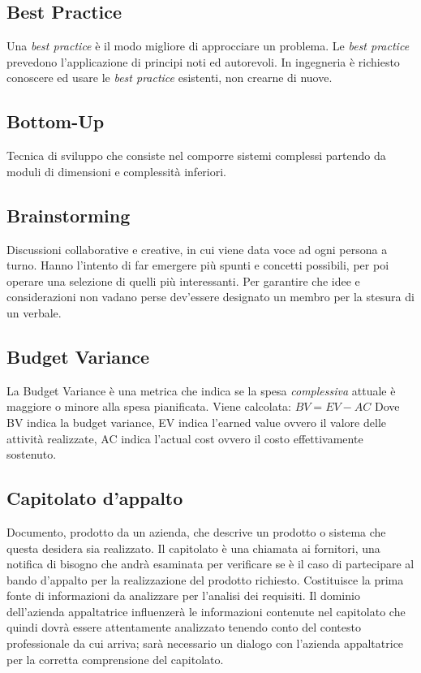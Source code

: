 	
	\subsection{Best Practice}
	\label{sec:bestpractice}
	Una \emph{best practice} è il modo migliore di approcciare un problema. Le \emph{best practice} prevedono l'applicazione di principi noti ed autorevoli. In ingegneria è richiesto conoscere ed usare le \emph{best practice} esistenti, non crearne di nuove.


	\subsection{Bottom-Up}
	\label{sec:bottomup}
	Tecnica di sviluppo che consiste nel comporre sistemi complessi partendo da moduli di dimensioni e complessità inferiori.
	
	
	\subsection{Brainstorming}
	\label{sec:brainstorming}
	Discussioni collaborative e creative, in cui viene data voce ad ogni persona a turno. Hanno l'intento di far emergere più spunti e concetti possibili, per poi operare una selezione di quelli più interessanti. Per garantire che idee e considerazioni non vadano perse dev'essere designato un membro per la stesura di un verbale.

	
	\subsection{Budget Variance}
	\label{sec:budgetvariance}
	La Budget Variance è una metrica che indica se la spesa \textit{complessiva} attuale è maggiore o minore alla spesa pianificata. Viene calcolata: $BV = EV - AC$ Dove BV indica la budget variance, EV indica l'earned value ovvero il valore delle attività realizzate, AC indica l'actual cost ovvero il costo effettivamente sostenuto.
	
	\newpage

	
	\subsection{Capitolato d'appalto}
	\label{sec:capitolato}
	Documento, prodotto da un azienda, che descrive un prodotto o sistema che questa desidera sia realizzato. Il capitolato è una chiamata ai fornitori, una notifica di bisogno che andrà esaminata per verificare se è il caso di partecipare al bando d'appalto per la realizzazione del prodotto richiesto. Costituisce la prima fonte di informazioni da analizzare per l'analisi dei requisiti. Il dominio dell'azienda appaltatrice influenzerà le informazioni contenute nel capitolato che quindi dovrà essere attentamente analizzato tenendo conto del contesto professionale da cui arriva; sarà necessario un dialogo con l'azienda appaltatrice per la corretta comprensione del capitolato.


